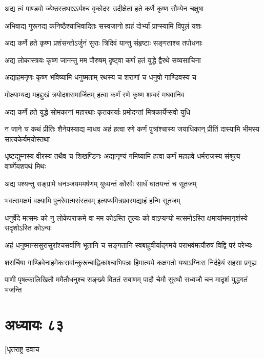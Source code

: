 \twolineshloka
{अद्य त्वं पाण्डवो ज्येष्ठस्तथाऽऽर्यश्च वृकोदरः}
{उदीक्षेतां हते कर्णे कृष्ण सौम्येन चक्षुषा}


\twolineshloka
{अभिवाद्य गुरूनद्य कनिष्ठैश्चाभिवादितः}
{सस्वजानो ह्यहं दोर्भ्यां प्राप्स्यामि विपूलं यशः}


\twolineshloka
{अद्य कर्णे हते कृष्ण प्रशंसन्तोऽर्जुनं सुराः}
{त्रिदिवं यान्तु संहृष्टाः सङ्गताश्च तपोधनाः}


\twolineshloka
{अद्य लोकास्त्रयः कृष्ण जानन्तु मम पौरुषम्}
{दृष्ट्वा कर्णं हतं युद्धे द्वैरथे सव्यसाचिना}


\twolineshloka
{अद्याहमनृणः कृष्ण भविष्यामि धनुष्मताम्}
{रथस्य च शराणां च धनुषो गाण्डिवस्य च}


\twolineshloka
{मोक्ष्याम्यद्य महद्दुःखं त्रयोदशसमार्जितम्}
{हत्वा कर्णं रणे कृष्ण शम्बरं मघवानिव}


\twolineshloka
{अद्य कर्णे हते युद्धे सोमकानां महारथाः}
{कृतकार्याः प्रमोदन्तां मित्रकार्येप्सवो युधि}


\threelineshloka
{न जाने च कथं प्रीतिः शैनेयस्याद्य माधव}
{अहं हत्वा रणे कर्णं पुत्रांश्चास्य जयाधिकान्}
{प्रीतिं दास्यामि भीमस्य सात्यकेर्यमयोस्तथा}


\threelineshloka
{धृष्टद्युम्नस्य वीरस्य तथैव च शिखण्डिनः}
{अद्यानृण्यं गमिष्यामि हत्वा कर्णं महाहवे}
{धर्मराजस्य संश्रुत्य वार्ष्णेयशपथं मिथः}


\twolineshloka
{अद्य पश्यन्तु सङ्ग्रामे धनञ्जयममर्षणम्}
{युध्यन्तं कौरवैः सार्धं घातयन्तं च सूतजम्}


\twolineshloka
{भवत्समक्षमं वक्ष्यामि पुनरेवात्मसंस्तवम्}
{इत्यप्यमित्रप्रवरमद्याहं हन्मि सूतजम्}


\twolineshloka
{धनुर्वेदे मत्समः को नु लोकेपराक्रमे वा मम कोऽस्ति तुल्यः}
{को वाऽप्यन्यो मत्समोऽस्ति क्षमायांममानृशंस्ये सदृशोऽस्ति कोऽन्यः}


\twolineshloka
{अहं धनुष्मान्ससुरासुरांश्चसर्वाणि भूतानि च सङ्गतानि}
{स्वबाहुवीर्याद्गमये पराभवंमत्पौरुषं विद्वि परं परेभ्यः}


\twolineshloka
{शरार्चिषा गाण्डिवेनाहमेकःसर्वान्कुरून्बाह्लिकांश्चाभिपन्नः}
{हिमात्यये कक्षगतो यथाऽग्निःस निर्दहेयं सहसा प्रगृह्य}


\twolineshloka
{पाणी पृषत्कालिखितौ ममैतौधनुश्च सङ्ख्ये विततं सबाणम्}
{पादौ चेमौ सुरथौ सध्वजौ चन मादृशं युद्धगतं भजन्ति}


\chapter{अध्यायः ८३}
\twolineshloka
{[धृतराष्ट्र उवाच}
{}


